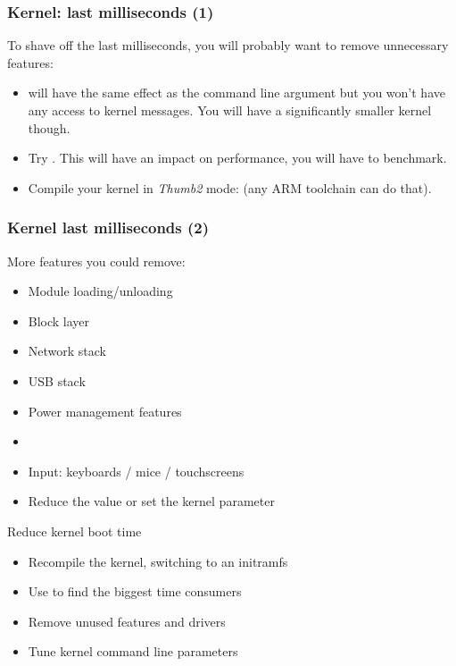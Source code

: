 \begin{frame}
\frametitle{Kernel: last milliseconds (1)}
To shave off the last milliseconds, you will probably want to remove
unnecessary features:
\begin{itemize}
        \item {} will have the same effect as the
               command line argument but you won't have
	      any access to kernel messages. You will have a
              significantly smaller kernel though.
        \item Try . This will have
              an impact on performance, you will have to benchmark.
	\item Compile your kernel in {\em Thumb2} mode:
	       (any ARM toolchain can do
	      that).
\end{itemize}
\end{frame}

\begin{frame}
\frametitle{Kernel last milliseconds (2)}
More features you could remove:
\begin{itemize}
        \item Module loading/unloading
        \item Block layer
        \item Network stack
        \item USB stack
        \item Power management features
        \item {}
        \item Input: keyboards / mice / touchscreens
        \item Reduce the  value or set the
               kernel parameter
\end{itemize}
\end{frame}

\setuplabframe
{Reduce kernel boot time}
{
\begin{itemize}
\item Recompile the kernel, switching to an initramfs
\item Use  to find the biggest
      time consumers
\item Remove unused features and drivers
\item Tune kernel command line parameters
\end{itemize}
}

